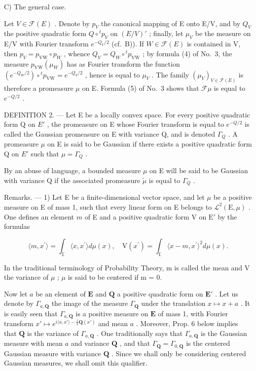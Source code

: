 C) The general case.

Let \(V \in \mathcal{F}(E)\) . Denote by \(p_V\) the canonical mapping of E onto E/V, and by \(Q_V\) the positive quadratic form \(Q \circ {}^t p_V\) on \((E/V)'\) ; finally, let \(\mu_V\) be the measure on E/V with Fourier transform \(e^{-Q_V/2}\) (cf.~B)). If \(W \in \mathcal{F}(E)\) is contained in V, then \(p_V = p_{\text{VW}} \circ p_W\) , whence \(Q_V = Q_W \circ {}^t p_{\text{VW}}\) ; by formula (4) of No.~3, the measure \(p_{\text{VW}}(\mu_W)\) has as Fourier transform the function \((e^{-Q_W/2}) \circ {}^t p_{\text{VW}} = e^{-Q_V/2}\) , hence is equal to \(\mu_V\) . The family \((\mu_V)_{V \in \mathcal{F}(E)}\) is therefore a promeasure \(\mu\) on E. Formula (5) of No.~3 shows that \(\mathcal{F}\mu\) is equal to \(e^{-Q/2}\) .

DEFINITION 2. --- Let E be a locally convex space. For every positive quadratic form Q on \(E'\) , the promeasure on E whose Fourier transform is equal to \(e^{-Q/2}\) is called the Gaussian promeasure on E with variance Q, and is denoted \(\Gamma_{Q}\) . A promeasure \(\mu\) on E is said to be Gaussian if there exists a positive quadratic form Q on \(E'\) such that \(\mu = \Gamma_{Q}\) .

By an abuse of language, a bounded measure \(\mu\) on E will be said to be Gaussian with variance Q if the associated promeasure \(\widetilde{\mu}\) is equal to \(\Gamma_{Q}\) .

Remarks. --- 1) Let E be a finite-dimensional vector space, and let \(\mu\) be a positive measure on E of mass 1, such that every linear form on E belongs to \(\mathcal{L}^{2}(\mathrm{E},\mu)\) . One defines an element \(m\) of E and a positive quadratic form V on \(\mathrm{E}'\) by the formulas

\[
\langle m, x ^ {\prime} \rangle = \int_ {\mathbb {E}} \langle x, x ^ {\prime} \rangle d \mu (x), \quad \mathrm{V} (x ^ {\prime}) = \int_ {\mathbb {E}} \langle x - m, x ^ {\prime} \rangle^ {2} d \mu (x).
\]

In the traditional terminology of Probability Theory, m is called the mean and V the variance of \(\mu\) ; \(\mu\) is said to be centered if m = 0.

Now let \(a\) be an element of \(\mathbf{E}\) and \(\mathbf{Q}\) a positive quadratic form on \(\mathbf{E}'\) . Let us denote by \(\Gamma_{a,\mathbf{Q}}\) the image of the measure \(\Gamma_{\mathbf{Q}}\) under the translation \(x \mapsto x + a\) . It is easily seen that \(\Gamma_{a,\mathbf{Q}}\) is a positive measure on \(\mathbf{E}\) of mass 1, with Fourier transform \(x' \mapsto e^{i\langle a,x'\rangle - \frac{1}{2}\mathbf{Q}(x')}\) and mean \(a\) . Moreover, Prop. 6 below implies that \(\mathbf{Q}\) is the variance of \(\Gamma_{a,\mathbf{Q}}\) . One traditionally says that \(\Gamma_{a,\mathbf{Q}}\) is the Gaussian measure with mean \(a\) and variance \(\mathbf{Q}\) , and that \(\Gamma_{\mathbf{Q}} = \Gamma_{0,\mathbf{Q}}\) is the centered Gaussian measure with variance \(\mathbf{Q}\) . Since we shall only be considering centered Gaussian measures, we shall omit this qualifier.

